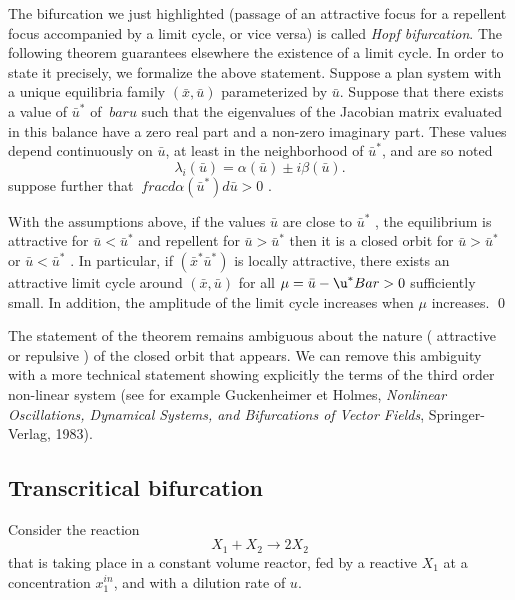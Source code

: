 {The bifurcation we just highlighted (passage of an attractive focus for a repellent focus accompanied by a limit cycle, or vice versa) is
called {\em Hopf bifurcation}. The following theorem guarantees elsewhere
the existence of a limit cycle. In order to state it precisely, we formalize the above statement. 
Suppose a plan system with a unique equilibria family $(\bar x , \bar u)$ parameterized by $\bar u$. 
Suppose that there exists a value of $\bar u^*$ of $ \ bar u $ such that the eigenvalues
of the Jacobian matrix evaluated in this balance have a zero real part and a non-zero imaginary part. 
These values depend continuously on $\bar u$, at least in the neighborhood of $\bar u ^*$, 
and are so noted $$ \lambda_i ( \bar u) = \alpha ( \bar u) \pm i \beta ( \bar u).$$ 
suppose further that $\ frac{ d \alpha ( \bar u ^*) {d} \bar u} > 0$ .

\begin{theoreme}
  With the assumptions above, if the values
 $ \bar u $ are close to $ \bar u^* $ , the equilibrium is attractive
 for $ \bar u < \bar u^* $ and repellent for $ \bar u > \bar u^* $ then
 it is a closed orbit for $ \bar u > \bar u^* $ or $ \bar u < \bar u^* $ .
 In particular, if $ ( \bar x^* \bar u^*)$ is locally attractive, there exists an attractive limit cycle around
 $ (\bar x , \bar u) $ for all $ \mu = \bar u- \u^* Bar > 0$ sufficiently small.
In addition, the amplitude of the limit cycle increases when $ \mu $ increases.
\qed
\end{theoreme}
   
\begin{remarque}
The statement of the theorem remains
ambiguous about the nature ( attractive or repulsive ) of the closed orbit
that appears. We can remove this ambiguity with
a more technical statement showing explicitly
the terms of the third order non-linear system
(see for example Guckenheimer et Holmes, 
{\em Nonlinear Oscillations, Dynamical Systems, and Bifurcations of Vector 
Fields}, Springer-Verlag, 1983). 
\end{remarque}

\subsection{Transcritical bifurcation}

Consider the reaction $$X_1 + X_2 \rightarrow 2 X_2$$ that is taking place in a constant volume reactor, fed by
a reactive $X_1$ at a concentration $x_1^{in}$, and with a dilution rate of $u$.

}
